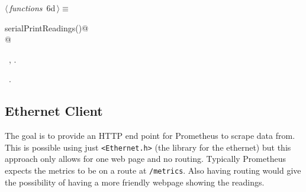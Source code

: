 \documentclass[a4paper, 11pt]{article}
\begin{document}
\begin{flushleft} \small
\begin{minipage}{\linewidth}\label{scrap6}\raggedright\small
{}$\langle\,${\itshape functions}\nobreak\ {\footnotesize{6d}}$\,\rangle\equiv$
\vspace{-1ex}
\begin{list}{}{\setlength{\leftmargin}{1em}} \item
\mbox{}\lstinline@void serialPrintReadings()@\\
\mbox{}@\\
\mbox{}{\NWsep}
\end{list}
\vspace{-1ex}
\vspace{-1ex}
\footnotesize
\begin{list}{}{\setlength{\itemsep}{-\parsep}\setlength{\itemindent}{-\leftmargin}}
\item \NWtxtMacroDefBy\ , .
\item \NWtxtMacroRefIn\ .
\end{list}
\end{minipage}
\end{flushleft}

\subsection{Ethernet Client}

The goal is to provide an HTTP end point for Prometheus to scrape data from.
This is possible using just \verb|<Ethernet.h>|
(the library for the ethernet)
but this approach only allows for one web page and no routing.
Typically Prometheus expects the metrics to be on a route at \verb|/metrics|.
Also having routing would give the possibility of having a more friendly webpage showing the readings.
\end{document}
